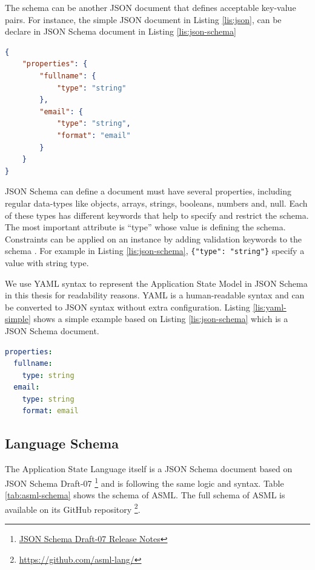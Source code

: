 The schema can be another JSON document that defines acceptable key-value pairs.
For instance, the simple JSON document in Listing \ref{lis:json}, can be declare in JSON Schema document in Listing \ref{lis:json-schema}

\lstset{
  label=lis:json-schema, caption=A simple JSON Schema document.
}
\begin{lstlisting}[language=json]
{
    "properties": {
        "fullname": {
            "type": "string"
        },
        "email": {
            "type": "string",
            "format": "email"
        }
    }
}
\end{lstlisting}

JSON Schema can define a document must have several properties, including regular data-types like objects, arrays, strings, booleans, numbers and, null. Each of these types has different keywords that help to specify and restrict the schema. The most important attribute is “type” whose value is defining the schema. Constraints can be applied on an instance by adding validation keywords to the schema \cite{json-model}. For example in Listing \ref{lis:json-schema}, \lstinline[basicstyle=\ttfamily]|{"type": "string"}| specify a value with string type.

We use YAML syntax to represent the Application State Model in JSON Schema in this thesis for readability reasons. YAML is a human-readable syntax and can be converted to JSON syntax without extra configuration. Listing \ref{lis:yaml-simple} shows a simple example based on Listing \ref{lis:json-schema} which is a JSON Schema document.

\lstset{
  label=lis:yaml-simple, caption=Example of expressing JSON Schema in YAML syntax., 
}
\begin{lstlisting}[language=yaml]
properties:
  fullname:
    type: string
  email:
    type: string
    format: email
\end{lstlisting}

\subsection{Language Schema}
The Application State Language itself is a JSON Schema document based on JSON Schema Draft-07
\footnote{\href{https://json-schema.org/draft-07/json-schema-release-notes.html}{JSON Schema Draft-07 Release Notes}}
and is following the same logic and syntax. Table \ref{tab:asml-schema} shows the schema of ASML. 
The full schema of ASML is available on its GitHub repository
\footnote{\href{https://github.com/asml-lang/asml/blob/master/schemas/schema.json}{https://github.com/asml-lang/}}.

